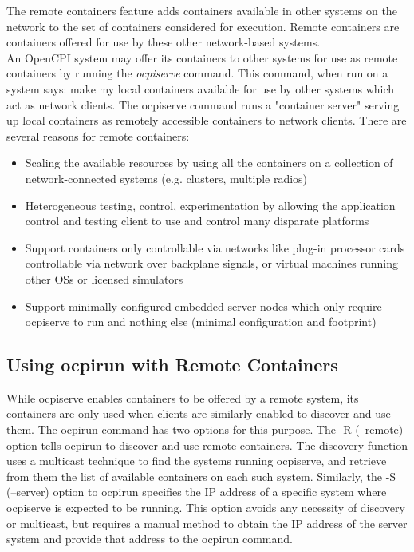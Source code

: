 \documentclass[10pt, a4paper, oneside]{article}
\renewcommand\_{\textunderscore\allowbreak} %
\begin{document}
The {remote containers} feature adds containers available in other systems on the network to the set of containers considered for execution.  Remote containers are containers offered for use by these other network-based systems.\\

An OpenCPI system may offer its containers to other systems for use as remote containers by running the \emph{ocpiserve} command.  This command, when run on a system says:  make my local containers available for use by other systems which act as network clients.  The ocpiserve command runs a "container server" serving up local containers as remotely accessible containers to network clients. There are several reasons for remote containers:
\begin{itemize}
\item  Scaling the available resources by using all the containers on a collection of network-connected systems (e.g. clusters, multiple radios)
\item  Heterogeneous testing, control, experimentation by allowing the application control and testing client to use and control many disparate platforms
\item  Support containers only controllable via networks like plug-in processor cards controllable via network over backplane signals, or virtual machines running other OSs or licensed simulators
\item  Support minimally configured embedded server nodes which only require ocpiserve to run and nothing else (minimal configuration and footprint)
\end{itemize}
\subsection{Using ocpirun with Remote Containers} While ocpiserve enables containers to be offered by a remote system,  its containers are only used when clients are similarly enabled to discover and use them.  The ocpirun command has two options for this purpose. The -R (--remote) option tells ocpirun to discover and use remote containers.  The discovery function uses a multicast technique to find the systems running ocpiserve, and retrieve from them the list of available containers on each such system. Similarly, the -S (--server) option to ocpirun specifies the IP address of a specific system where ocpiserve is expected to be running.  This option avoids any necessity of discovery or multicast, but requires a manual method to obtain the IP address of the server system and provide that address to the ocpirun command. \\
\end{document}
